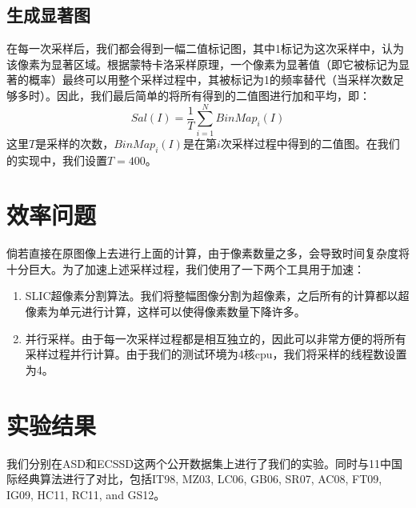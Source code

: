 \subsection{生成显著图}
在每一次采样后，我们都会得到一幅二值标记图，其中1标记为这次采样中，认为该像素为显著区域。根据蒙特卡洛采样原理，一个像素为显著值（即它被标记为显著的概率）最终可以用整个采样过程中，其被标记为1的频率替代（当采样次数足够多时）。因此，我们最后简单的将所有得到的二值图进行加和平均，即：
\begin{equation}
Sal(I) = \frac{1}{T}\sum_{i=1}^{N}BinMap_i(I)
\end{equation}
这里$T$是采样的次数，$BinMap_i(I)$是在第$i$次采样过程中得到的二值图。在我们的实现中，我们设置$T=400$。

\section{效率问题}
倘若直接在原图像上去进行上面的计算，由于像素数量之多，会导致时间复杂度将十分巨大。为了加速上述采样过程，我们使用了一下两个工具用于加速：
\begin{enumerate}
\item SLIC超像素分割算法\cite{achanta2010slic}。我们将整幅图像分割为超像素，之后所有的计算都以超像素为单元进行计算，这样可以使得像素数量下降许多。
\item 并行采样。由于每一次采样过程都是相互独立的，因此可以非常方便的将所有采样过程并行计算。由于我们的测试环境为4核cpu，我们将采样的线程数设置为4。
\end{enumerate}

\section{实验结果}
我们分别在ASD\cite{achanta2009frequency}和ECSSD\cite{yan2013hierarchical}这两个公开数据集上进行了我们的实验。同时与11中国际经典算法进行了对比，包括IT98\cite{itti1998model}, MZ03\cite{ma2003contrast}, LC06\cite{zhai2006visual}, GB06\cite{harel2006graph}, SR07\cite{hou2007saliency},  AC08\cite{achanta2008salient}, FT09\cite{achanta2009frequency},  IG09\cite{achanta2009frequency}, HC11\cite{cheng2011global}, RC11\cite{cheng2011global}, and GS12\cite{wei2012geodesic}。

